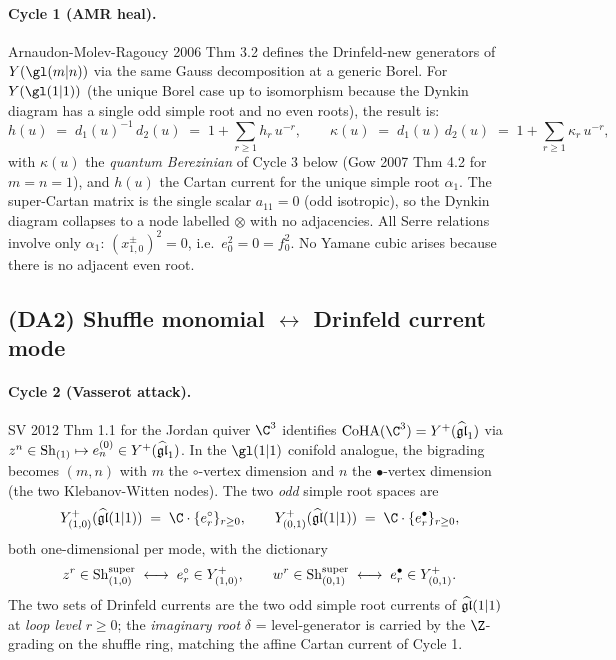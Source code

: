 \paragraph{Cycle 1 (AMR heal).} Arnaudon-Molev-Ragoucy 2006 Thm 3.2
defines the Drinfeld-new generators of $Y(\gl(m|n))$ via the same
Gauss decomposition at a generic Borel. For $Y(\gl(1|1))$ (the unique
Borel case up to isomorphism because the Dynkin diagram has a single
odd simple root and no even roots), the result is:
\begin{equation}
\label{eq:gl11-drinfeld-new}
  h(u) \;=\; d_1(u)^{-1}\, d_2(u)
  \;=\; 1 + \sum_{r \geq 1} h_r\, u^{-r},
  \qquad
  \kappa(u) \;=\; d_1(u)\, d_2(u)
  \;=\; 1 + \sum_{r \geq 1} \kappa_r\, u^{-r},
\end{equation}
with $\kappa(u)$ the \emph{quantum Berezinian} of Cycle 3 below
(Gow 2007 Thm 4.2 for $m=n=1$), and $h(u)$ the Cartan current for the
unique simple root $\alpha_1$. The super-Cartan matrix is the single
scalar $a_{11} = 0$ (odd isotropic), so the Dynkin diagram collapses
to a node labelled $\otimes$ with no adjacencies. All Serre relations
involve only $\alpha_1$: $(x^\pm_{1,0})^2 = 0$, i.e.\ $e_0^2 = 0 = f_0^2$.
No Yamane cubic arises because there is no adjacent even root.

\subsection*{(DA2) Shuffle monomial $\leftrightarrow$ Drinfeld current mode}

\paragraph{Cycle 2 (Vasserot attack).} SV 2012 Thm 1.1 for the Jordan
quiver $\C^3$ identifies $\CoHA(\C^3) = Y^+(\widehat{\fgl}_1)$ via
$z^n \in \mathrm{Sh}_{(1)} \mapsto e^{(0)}_n \in Y^+(\widehat{\mathfrak{gl}}_1)$. In
the $\gl(1|1)$ conifold analogue, the bigrading becomes $(m,n)$ with
$m$ the $\circ$-vertex dimension and $n$ the $\bullet$-vertex
dimension (the two Klebanov-Witten nodes). The two \emph{odd} simple
root spaces are
\[
  Y^+_{(1,0)}(\widehat{\fgl}(1|1)) \;=\; \C\cdot\{e^\circ_r\}_{r \geq 0},
  \qquad
  Y^+_{(0,1)}(\widehat{\fgl}(1|1)) \;=\; \C\cdot\{e^\bullet_r\}_{r \geq 0},
\]
both one-dimensional per mode, with the dictionary
\begin{equation}
\label{eq:shuffle-drinfeld-single}
  z^r \in \mathrm{Sh}^{\mathrm{super}}_{(1,0)} \;\longleftrightarrow\;
  e^\circ_r \in Y^+_{(1,0)}, \qquad
  w^r \in \mathrm{Sh}^{\mathrm{super}}_{(0,1)} \;\longleftrightarrow\;
  e^\bullet_r \in Y^+_{(0,1)}.
\end{equation}
The two sets of Drinfeld currents are the two odd simple root
currents of $\widehat{\mathfrak{gl}}(1|1)$ at \emph{loop level} $r \geq 0$;
the \emph{imaginary root} $\delta$ = level-generator is carried by
the $\Z$-grading on the shuffle ring, matching the affine Cartan
current of Cycle 1.

